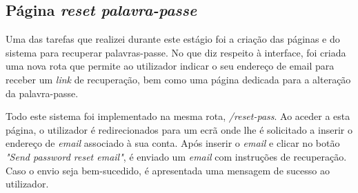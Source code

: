 


\clearpage
\subsection{Página \textit{reset palavra-passe}}\label{sec:resetPassword} %
Uma das tarefas que realizei durante este estágio foi a criação das páginas e do sistema para recuperar palavras-passe. No que diz respeito à interface, foi criada uma nova rota que permite ao utilizador indicar o seu endereço de email para receber um \textit{link} de recuperação, bem como uma página dedicada para a alteração da palavra-passe. 

Todo este sistema foi implementado na mesma rota, \textit{/reset-pass}. Ao aceder a esta página, o utilizador é redirecionados para um ecrã onde lhe é solicitado a inserir o endereço de \textit{email} associado à sua conta. Após inserir o \textit{email} e clicar no botão \textit{"Send password reset email"}, é enviado um \textit{email} com instruções de recuperação. Caso o envio seja bem-sucedido, é apresentada uma mensagem de sucesso ao utilizador.

